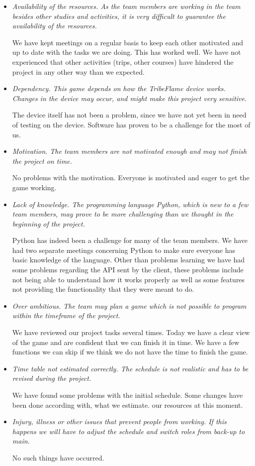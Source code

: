 \documentclass[12pt,a4paper]{article}
\begin{document}
\begin{itemize}
\item \textit{Availability of the resources. As the team members are working in the team besides other studies and activities, it is very difficult to guarantee the availability of the resources.}

We have kept meetings on a regular basis to keep each other motivated and up to date with the tasks we are doing. This has worked well. We have not experienced that other activities (trips, other courses) have hindered the project in any other way than we expected.
\item \textit{Dependency. This game depends on how the TribeFlame device works. Changes in the device may occur, and might make this project very sensitive.}

The device itself has not been a problem, since we have not yet been in need of testing on the device. Software has proven to be a challenge for the most of us.

\item \textit{Motivation. The team members are not motivated enough and may not finish the project on time.}

No problems with the motivation. Everyone is motivated and eager to get the game working.

\item \textit{Lack of knowledge. The programming language Python, which is new to a few team members, may prove to be more challenging than we thought in the beginning of the project.}

Python has indeed been a challenge for many of the team members. We have had two separate meetings concerning Python to make sure everyone has basic knowledge of the language. Other than problems learning we have had some problems regarding the API sent by the client, these problems include not being able to understand how it works properly as well as some features not providing the functionality that they were meant to do.

\item \textit{Over ambitious. The team may plan a game which is not possible to program within the timeframe of the project.}

We have reviewed our project tasks several times. Today we have a clear view of the game and are confident that we can finish it in time. We have a few functions we can skip if we think we do not have the time to finish the game.

\item \textit{Time table not estimated correctly. The schedule is not realistic and has to be revised during the project.}

We have found some problems with the initial schedule. Some changes have been done according with, what we estimate. our resources at this moment.

\item \textit{Injury, illness or other issues that prevent people from working. If this happens we will have to adjust the schedule and switch roles from back-up to main.}

No such things have occurred.
\end{itemize}
\end{document}

